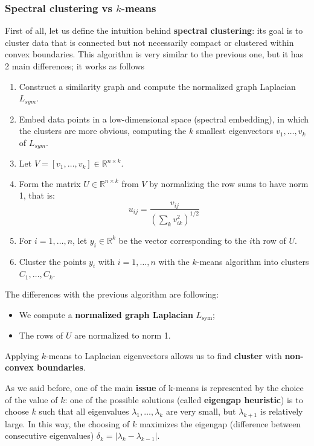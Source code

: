 \subsubsection{Spectral clustering vs $k$-means}
First of all, let us define the intuition behind \textbf{spectral clustering}: its goal is to cluster data that is connected but not necessarily compact or clustered within convex boundaries. This algorithm is very similar to the previous one, but it has 2 main differences; it works as follows
\begin{enumerate}
	\item Construct a similarity graph and compute the normalized graph Laplacian $L_{sym}$.
	\item Embed data points in a low-dimensional space (spectral embedding), in which the clusters are more obvious, computing the $k$ smallest eigenvectors $v_1, \dots, v_k$ of $L_{sym}$. 
	\item Let $V=\left[v_1,\dots, v_k \right] \in \mathbb{ R }^{n \times k}$.
	\item Form the matrix $U \in \mathbb{ R }^{n \times k}$ from $V$ by normalizing the row sums to have norm 1, that is: 
	$$u_ { i j } = \frac { v _ { i j } } { \left( \sum _ { k } v _ { i k } ^ { 2 } \right) ^ { 1 / 2 } }$$
	\item For $i=1,\dots, n$, let $y _ { i } \in \mathbb { R } ^ { k }$ be the vector corresponding to the $i$th row of $U$.
	\item Cluster the points $y_i$ with $i=1,\dots,n$ with the $k$-means algorithm into clusters $C_1, \dots, C_k$.
\end{enumerate}
The differences with the previous algorithm are following:

\begin{itemize}
    \item We compute a \textbf{normalized graph Laplacian} $L_{\text{sym}}$;
    \item The rows of $U$ are normalized to norm 1.
\end{itemize}

Applying $k$-means to Laplacian eigenvectors allows us to find \textbf{cluster} with \textbf{non-convex boundaries}.


As we said before, one of the main \textbf{issue} of k-means is represented by the choice of the value of $k$: one of the possible solutions (called \textbf{eigengap heuristic}) is to choose $k$ such that all eigenvalues $\lambda_1, \dots, \lambda_k$ are very small, but $\lambda_{k+1}$ is relatively large. In this way, the choosing of $k$ maximizes the eigengap (difference between consecutive eigenvalues) $\delta_k = |\lambda_k - \lambda_{k-1}|$.
